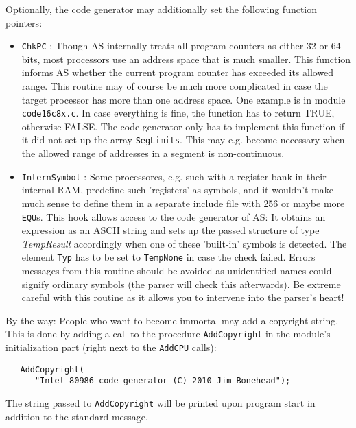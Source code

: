 \documentclass[12pt,twoside]{report}
\newcommand{\tty}[1]{{\tt #1}}
\begin{document}
Optionally, the code generator may additionally set the following function
pointers:
\begin{itemize}
\item{\tty{ChkPC} : Though AS internally treats all program counters as
      either 32 or 64 bits, most processors use an address space that is
      much smaller.  This function informs AS whether the current program
      counter has exceeded its allowed range.  This routine may of course
      be much more complicated in case the target processor has more than
      one address space.  One example is in module \tty{code16c8x.c}.  In
      case everything is fine, the function has to return TRUE, otherwise
      FALSE.  The code generator only has to implement this function if
      it did not set up the array {\tt SegLimits}.  This may e.g. become
      necessary when the allowed range of addresses in a segment is 
      non-continuous.}
\item{\tty{InternSymbol} : Some processorcs, e.g. such with a register
      bank in their internal RAM, predefine such 'registers' as symbols, 
      and it wouldn't make much sense to define them in a separate include
      file with 256 or maybe more {\tt EQU}s.  This hook allows access to
      the code generator of AS: It obtains an expression as an ASCII
      string and sets up the passed structure of type {\em TempResult}
      accordingly when one of these 'built-in' symbols is detected.  The
      element {\tt Typ} has to be set to {\tt TempNone} in case the check
      failed.  Errors messages from this routine should be avoided as
      unidentified names could signify ordinary symbols (the parser will
      check this afterwards).  Be extreme careful with this routine as
      it allows you to intervene into the parser's heart!}
\end{itemize}

By the way: People who want to become immortal may add a copyright
string.  This is done by adding a call to the procedure \tty{AddCopyright}
in the module's initialization part (right next to the \tty{AddCPU} calls):
\begin{verbatim}
   AddCopyright(
      "Intel 80986 code generator (C) 2010 Jim Bonehead");
\end{verbatim}
The string passed to \tty{AddCopyright} will be printed upon program start
in addition to the standard message.
\end{document}
